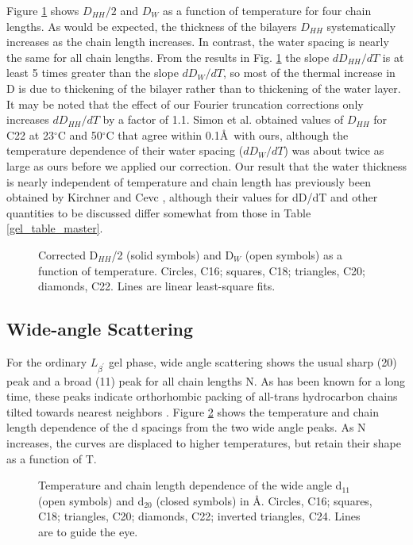 Figure \ref{gel_spc} shows $D_{HH}/2$ and $D_W$ as a function of temperature
for four chain lengths.  As would be expected, the thickness of the
bilayers $D_{HH}$ systematically increases as the chain 
length increases. In contrast, the water spacing is 
nearly the same for all chain lengths.  From
the results in Fig. \ref{gel_spc} the slope $dD_{HH}/dT$ is at least 5 times
greater than the slope $dD_{W}/dT$, so most of the thermal increase in D
is due to thickening of the bilayer rather than to thickening of
the water layer. It may be noted that the effect of our 
Fourier truncation corrections only increases $dD_{HH}/dT$ by a factor
of 1.1.  Simon et al. \cite{Simon95} obtained values of $D_{HH}$ for
C22 at 23$^{\circ}$C and 50$^{\circ}$C that agree within
0.1\AA\ with ours, although the temperature 
dependence of their
water spacing ($dD_{W}/dT$) was about twice as large as ours before we applied
our correction.
Our result that the water thickness is nearly independent of 
temperature 
and chain length has previously been obtained by Kirchner and Cevc
\cite{Kir94}, although their values for dD/dT and other quantities to be
discussed differ somewhat from those in Table \ref{gel_table_master}.

\begin{figure}[h]
\centerline {}
\caption{Corrected D$_{HH}$/2 (solid symbols) and D$_W$ (open symbols) as 
a function of temperature. Circles, C16;
squares, C18; triangles, C20; diamonds, C22. 
Lines are linear least-square fits.
\label{gel_spc}}
\end{figure}

\subsection{Wide-angle Scattering}

For the ordinary $L_{{\beta}^{'}}$ gel phase, wide angle scattering shows 
the usual sharp (20) peak and a broad (11) peak for all chain lengths N.  
As has been known for a long time, these peaks
indicate orthorhombic packing of all-trans hydrocarbon chains tilted
towards nearest neighbors \cite{Sun94,LevTh,McI80}.
Figure \ref{gel_d20} shows
the temperature and chain length dependence of the d spacings from
the two wide angle peaks.  As N increases, the curves are
displaced to higher temperatures, but retain their shape as a function
of T.  

\begin{figure}
\centerline {}
\caption{Temperature and chain length dependence 
of the wide angle d$_{11}$ (open symbols) and d$_{20}$ (closed symbols)
in {\AA}. Circles, C16; squares, C18; triangles, C20; diamonds,
C22; inverted triangles, C24. Lines are to guide the eye.
\label{gel_d20}}
\end{figure}

